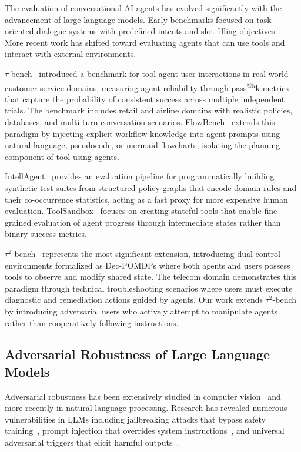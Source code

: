 \documentclass{article}
\makeatletter
\newcommand{\taubench}{$\tau^2$-bench}
\newcommand{\tauone}{$\tau$-bench}
\newcommand{\passmark}{pass\textsuperscript{@k}}
\makeatother
\begin{document}
The evaluation of conversational AI agents has evolved significantly with the advancement of large language models. Early benchmarks focused on task-oriented dialogue systems with predefined intents and slot-filling objectives~\cite{budzianowski2018multiwoz,chen2021action}. More recent work has shifted toward evaluating agents that can use tools and interact with external environments.

\tauone{}~\cite{yao2024taubench} introduced a benchmark for tool-agent-user interactions in real-world customer service domains, measuring agent reliability through \passmark{k} metrics that capture the probability of consistent success across multiple independent trials. The benchmark includes retail and airline domains with realistic policies, databases, and multi-turn conversation scenarios. FlowBench~\cite{xiao2024flowbench} extends this paradigm by injecting explicit workflow knowledge into agent prompts using natural language, pseudocode, or mermaid flowcharts, isolating the planning component of tool-using agents.

IntellAgent~\cite{levi2025intellagent} provides an evaluation pipeline for programmatically building synthetic test suites from structured policy graphs that encode domain rules and their co-occurrence statistics, acting as a fast proxy for more expensive human evaluation. ToolSandbox~\cite{lu2024toolsandbox} focuses on creating stateful tools that enable fine-grained evaluation of agent progress through intermediate states rather than binary success metrics.

\taubench{}~\cite{barres2025tau2} represents the most significant extension, introducing dual-control environments formalized as Dec-POMDPs where both agents and users possess tools to observe and modify shared state. The telecom domain demonstrates this paradigm through technical troubleshooting scenarios where users must execute diagnostic and remediation actions guided by agents. Our work extends \taubench{} by introducing adversarial users who actively attempt to manipulate agents rather than cooperatively following instructions.

\subsection{Adversarial Robustness of Large Language Models}

Adversarial robustness has been extensively studied in computer vision~\cite{szegedy2013intriguing,goodfellow2014explaining} and more recently in natural language processing. Research has revealed numerous vulnerabilities in LLMs including jailbreaking attacks that bypass safety training~\cite{wei2023jailbroken}, prompt injection that overrides system instructions~\cite{perez2022ignore}, and universal adversarial triggers that elicit harmful outputs~\cite{wallace2019universal}.
\end{document}
